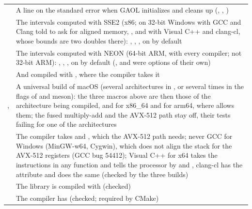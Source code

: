 \begin{longtable}{L{4.6cm}L{9.4cm}}
   & A line on the standard error when GAOL
  initializes and cleans up (,
  , )\\
   & The intervals computed with SSE2
  (x86; on 32-bit Windows with GCC and Clang told to ask for aligned memory,
  , and with Visual C++ and clang-cl, whose bounds
  are two doubles there): , ,
  , on by default\\
   & The intervals computed with NEON
  (64-bit ARM, with every compiler; not 32-bit ARM): ,
  , , on by default
  (,  and  were
  options of their own)\\
   & And compiled with ,
  where the compiler takes it\\
  ,  & A universal
  build of macOS (several architectures in ,
  or  several times in the flags of  and meson):
  the three macros above are then those of the architecture being compiled,
   and
   for x86\_64 and
   for arm64, where 
  allows them; the fused multiply-add and the AVX-512 path stay off, their
  tests failing for one of the architectures\\
   & The compiler takes
   and
  , which the AVX-512 path needs;
  never GCC for Windows (MinGW-w64, Cygwin), which does not align the stack
  for the AVX-512 registers (GCC bug 54412); Visual C++ for x64 takes the
  instructions in any function and tells the processor by  and
  , clang-cl has the attribute and does the same (checked by the
  three builds)\\
   & The library is compiled with
   (checked)\\
   & The compiler has  (checked;
  required by CMake)\\
\end{longtable}

